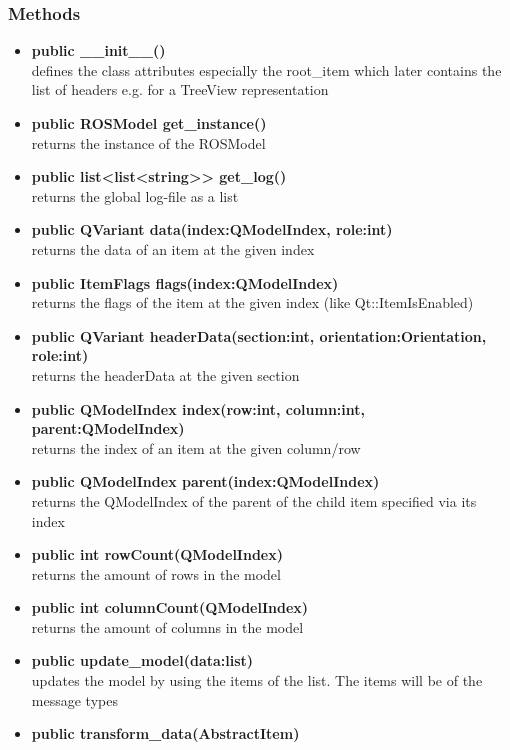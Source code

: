 \subsubsection{Methods}
\begin{itemize}
  \item \textbf{public \_\_init\_\_()}\\ 
  defines the class attributes especially the root\_item which later contains the list of headers e.g. for a TreeView representation
  \item \textbf{public ROSModel get\_instance()}\\
  returns the instance of the ROSModel
  \item \textbf{public list<list<string>> get\_log()}\\
  returns the global log-file as a list
  \item \textbf{public QVariant data(index:QModelIndex, role:int)}\\
  returns the data of an item at the given index
  \item \textbf{public ItemFlags flags(index:QModelIndex)}\\
  returns the flags of the item at the given index (like Qt::ItemIsEnabled)
  \item \textbf{public QVariant headerData(section:int, orientation:Orientation,
  role:int)}\\ 
  returns the headerData  at the given section
  \item \textbf{public QModelIndex index(row:int, column:int,
  parent:QModelIndex)}\\
  returns the index of an item at the given column/row
  \item \textbf{public QModelIndex parent(index:QModelIndex)}\\ 
  returns the QModelIndex of the parent of the child item specified via its index
  \item \textbf{public int rowCount(QModelIndex)}\\ 
  returns the amount of rows in the model
  \item \textbf{public int columnCount(QModelIndex)}\\
  returns the amount of columns in the model
  \item \textbf{public update\_model(data:list)}\\ 
  updates the model by using the items of the list. The items will be of the message types 
  \item \textbf{public transform\_data(AbstractItem)}\\ 

\end{itemize}
